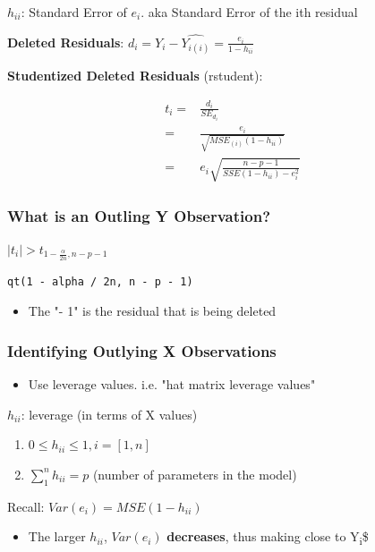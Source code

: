\documentclass[11pt]{article}
\begin{document}
\(h_{ii}\): Standard Error of \(e_i\). aka Standard Error of the ith residual

\textbf{Deleted Residuals}: \(d_i = Y_i - \hat{Y_{i(i)}} = \frac{e_i}{1 - h_{ii}}\)

\textbf{Studentized Deleted Residuals} (rstudent):

\begin{equation}
\begin{split}
t_i = & \frac{d_i}{SE_{d_i}}\\
= & \frac{e_i}{\sqrt{MSE_{(i)}(1 - h_{ii})}}\\
= & e_i \sqrt{\frac{n - p - 1}{SSE(1 - h_{ii}) - e_i^2} }
\end{split}
\end{equation}

\subsubsection{What is an Outling Y Observation?}
\label{sec:org8b7b0b8}
\(|t_i| > t_{1 - \frac{\alpha}{2n}, n - p - 1}\)
\begin{verbatim}
qt(1 - alpha / 2n, n - p - 1)
\end{verbatim}
\begin{itemize}
\item The "- 1" is the residual that is being deleted
\end{itemize}
\subsubsection{Identifying Outlying X Observations}
\label{sec:org99dd6ad}
\begin{itemize}
\item Use leverage values. i.e. "hat matrix leverage values"
\end{itemize}
\(h_{ii}\): leverage (in terms of X values)
\begin{enumerate}
\item \(0 \leq h_{ii} \leq 1, i = [1,n]\)
\item \(\sum_{1}^{n} h_{ii} = p\) (number of parameters in the model)
\end{enumerate}

Recall: \(Var(e_i) = MSE(1 - h_{ii})\)
\begin{itemize}
\item The larger \(h_{ii}\), \(Var(e_i)\) \textbf{decreases}, thus making  close to
Y\textsubscript{i}\$
\end{itemize}
\end{document}
